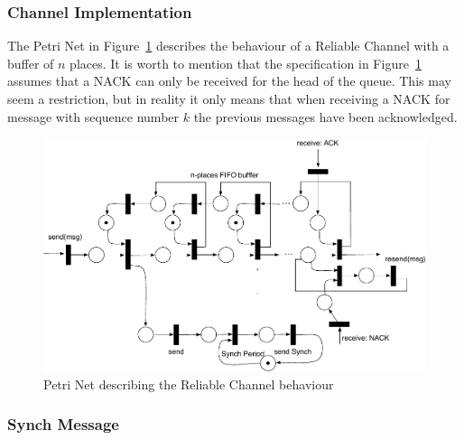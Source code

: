 \documentclass[a4paper,oneside,article]{memoir}
\begin{document}
\subsubsection{Channel Implementation}

The Petri Net in Figure~\ref{fig:reliable-channel} describes the behaviour of a Reliable Channel
with a buffer of $n$ places.  It is worth to mention that the specification in
Figure~\ref{fig:reliable-channel} assumes that a NACK can only be received for the head of the
queue.  This may seem a restriction, but in reality it only means that when receiving a NACK for
message with sequence number $k$ the previous messages have been acknowledged.

\begin{figure}
\centering
\includegraphics[scale=0.6]{xrce-relchan.pdf}
\caption{Petri Net describing the Reliable Channel behaviour}\label{fig:reliable-channel}
\end{figure}

\subsubsection{Synch Message}
\end{document}
